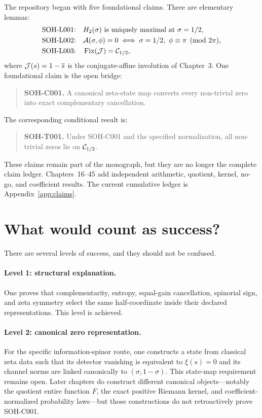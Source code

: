The repository began with five foundational claims. Three are elementary lemmas:
\begin{align*}
\text{SOH-L001:}&\quad \Hbin(\sigma)\text{ is uniquely maximal at }\sigma=1/2,\\
\text{SOH-L002:}&\quad \Acomp(\sigma,\phi)=0\iff \sigma=1/2,\ \phi\equiv\pi\pmod{2\pi},\\
\text{SOH-L003:}&\quad \operatorname{Fix}(\J)=\Crit,
\end{align*}
where $\mathcal{J}(s)=1-\overline{s}$ is the conjugate-affine involution of Chapter~3. One foundational claim is the open bridge:
\begin{quote}
\textbf{SOH-C001.} A canonical zeta-state map converts every non-trivial zero into exact complementary cancellation.
\end{quote}
The corresponding conditional result is:
\begin{quote}
\textbf{SOH-T001.} Under SOH-C001 and the specified normalization, all non-trivial zeros lie on $\mathcal{C}_{1/2}$.
\end{quote}

These claims remain part of the monograph, but they are no longer the complete claim ledger. Chapters~16--45 add independent arithmetic, quotient, kernel, no-go, and coefficient results. The current cumulative ledger is Appendix~\ref{app:claims}.

\section{What would count as success?}

There are several levels of success, and they should not be confused.

\paragraph{Level 1: structural explanation.}
One proves that complementarity, entropy, equal-gain cancellation, spinorial sign, and zeta symmetry select the same half-coordinate inside their declared representations. This level is achieved.

\paragraph{Level 2: canonical zero representation.}
For the specific information-spinor route, one constructs a state from classical zeta data such that its detector vanishing is equivalent to $\xi(s)=0$ and its channel norms are linked canonically to $(\sigma,1-\sigma)$. This state-map requirement remains open. Later chapters do construct different canonical objects---notably the quotient entire function $F$, the exact positive Riemann kernel, and coefficient-normalized probability laws---but those constructions do not retroactively prove SOH-C001.

